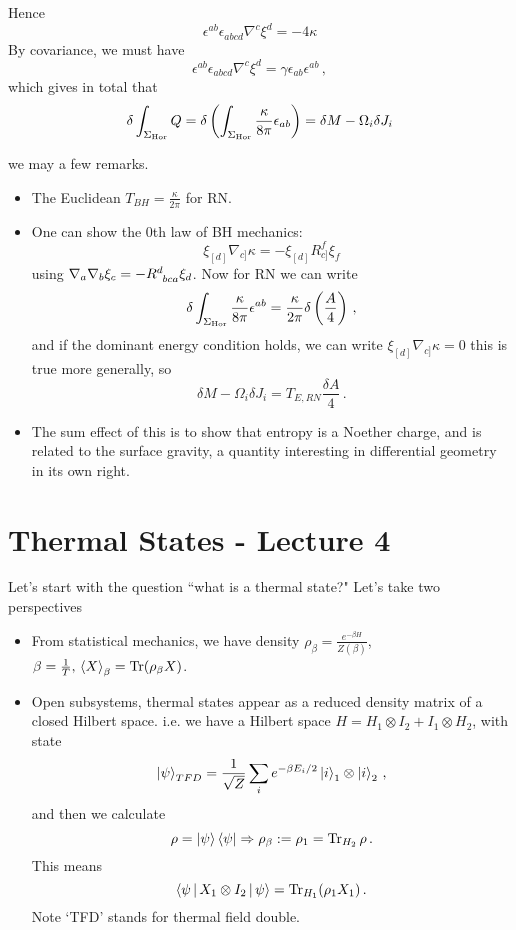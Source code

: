 \documentclass{article}
\begin{document}
Hence 
\[
\epsilon^{ab} \epsilon_{abcd} \nabla^c \xi^d = -4 \kappa 
\]
By covariance, we must have 
\[
\epsilon^{ab} \epsilon_{abcd} \nabla^c \xi^d = \gamma \epsilon_{ab} \epsilon^{ab} \, ,
\]
which gives in total that 
\[
\delta \int_{\Sigma_{\text{Hor}}} Q = \delta \left( \int_{\Sigma_{\text{Hor}}}\frac{\kappa}{8 \pi }\epsilon_{ab} \right) = \delta M - \Omega_i \delta J_i
\]
\begin{remark}
	we may a few remarks. 
	\begin{itemize}
		\item The Euclidean $T_{BH} = \frac{\kappa}{2\pi}$ for RN. 
		\item One can show the 0th law of BH mechanics: 
		\[
		\xi_{[d]}\nabla_{c]}\kappa = -\xi_{[d]}R_{c]}^f \xi_f
		\]
		using $\nabla_a \nabla_b \xi_c = -R\indices{^d_b_c_a} \xi_d$. Now for RN we can write 
		\[
		\delta\int_{\Sigma_{\text{Hor}}} \frac{\kappa}{8 \pi} \epsilon^{ab} = \frac{\kappa}{2\pi}\delta \left( \frac{A}{4} \right) \, , 
		\]
		and if the dominant energy condition holds, we can write $\xi_{[d]} \nabla_{c]} \kappa = 0$ this is true more generally, so 
		\[
		\delta M - \Omega_i \delta J_i = T_{E, RN} \frac{\delta A}{4} \, . 
		\]
		\item The sum effect of this is to show that entropy is a Noether charge, and is related to the surface gravity, a quantity interesting in differential geometry in its own right.
	\end{itemize}
\end{remark}

\section{Thermal States - Lecture 4}
Let's start with the question ``what is a thermal state?" Let's take two perspectives
\begin{itemize}
	\item From statistical mechanics, we have density $\rho_\beta = \frac{e^{-\beta H}}{Z(\beta)}$, $\beta=\frac{1}{T}, \, \left\langle X \right\rangle_\beta = \operatorname{Tr}(\rho_\beta X)$. 
	\item Open subsystems, thermal states appear as a reduced density matrix of a closed Hilbert space. i.e. we have a Hilbert space $H = H_1 \otimes I_2 + I_1 \otimes H_2$, with state 
	\[
	\ket{\psi}_{TFD} = \frac{1}{\sqrt{Z}} \sum_i e^{-\beta E_i / 2 } \ket{i}_1 \otimes \ket{i}_2 \, , 
	\]
	and then we calculate 
	\[
	\rho = \ket{\psi}\bra{\psi} \Rightarrow \rho_\beta := \rho_1 = \operatorname{Tr}_{H_2} \rho \, .
	\]
	This means 
	\[
	\left\langle \psi \, | \, X_1 \otimes I_2 \, | \, \psi \right\rangle = \operatorname{Tr}_{H_1}(\rho_1 X_1) \, . 
	\]
	Note `TFD' stands for thermal field double. 
\end{itemize}
\end{document}
